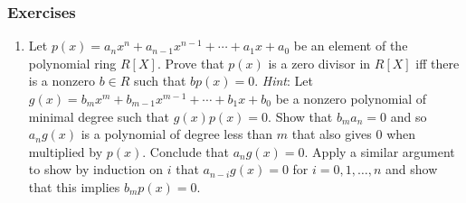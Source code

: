 \documentclass[../notes.tex]{subfiles}
\begin{document}
\subsubsection*{Exercises}
\begin{enumerate}[label={\textbf{\arabic*.}},ref={7.2.\arabic*}]
    \item \label{exr:7.2.2}Let $p(x)=a_nx^n+a_{n-1}x^{n-1}+\cdots+a_1x+a_0$ be an element of the polynomial ring $R[X]$. Prove that $p(x)$ is a zero divisor in $R[X]$ iff there is a nonzero $b\in R$ such that $bp(x)=0$. \emph{Hint}: Let $g(x)=b_mx^m+b_{m-1}x^{m-1}+\cdots+b_1x+b_0$ be a nonzero polynomial of minimal degree such that $g(x)p(x)=0$. Show that $b_ma_n=0$ and so $a_ng(x)$ is a polynomial of degree less than $m$ that also gives 0 when multiplied by $p(x)$. Conclude that $a_ng(x)=0$. Apply a similar argument to show by induction on $i$ that $a_{n-i}g(x)=0$ for $i=0,1,\dots,n$ and show that this implies $b_mp(x)=0$.
\end{enumerate}
\end{document}
